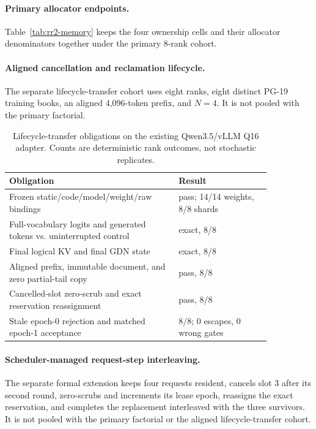 \documentclass{article}
\begin{document}
\paragraph{Primary allocator endpoints.}
Table~\ref{tab:rr2-memory} keeps the four ownership cells and their allocator
denominators together under the primary 8-rank cohort.


\paragraph{Aligned cancellation and reclamation lifecycle.}
The separate lifecycle-transfer cohort uses eight ranks, eight distinct PG-19
training books, an aligned 4,096-token prefix, and $N=4$.  It is not pooled
with the primary factorial.

\begin{table}[H]
\caption{Lifecycle-transfer obligations on the existing Qwen3.5/vLLM Q16
adapter.  Counts are deterministic rank outcomes, not stochastic replicates.}
\label{tab:lifecycle-transfer}
\centering\small
\begin{tabular}{@{}p{0.55\linewidth}p{0.30\linewidth}@{}}
\toprule
Obligation & Result \\
\midrule
Frozen static/code/model/weight/raw bindings & pass; 14/14 weights, 8/8 shards \\
Full-vocabulary logits and generated tokens vs. uninterrupted control & exact, 8/8 \\
Final logical KV and final GDN state & exact, 8/8 \\
Aligned prefix, immutable document, and zero partial-tail copy & pass, 8/8 \\
Cancelled-slot zero-scrub and exact reservation reassignment & pass, 8/8 \\
Stale epoch-0 rejection and matched epoch-1 acceptance & 8/8; 0 escapes, 0 wrong gates \\
\bottomrule
\end{tabular}
\end{table}

\paragraph{Scheduler-managed request-step interleaving.}
The separate formal extension keeps four requests resident, cancels slot 3
after its second round, zero-scrubs and increments its lease epoch, reassigns
the exact reservation, and completes the replacement interleaved with the
three survivors.  It is not pooled with the primary factorial or the aligned
lifecycle-transfer cohort.
\end{document}
